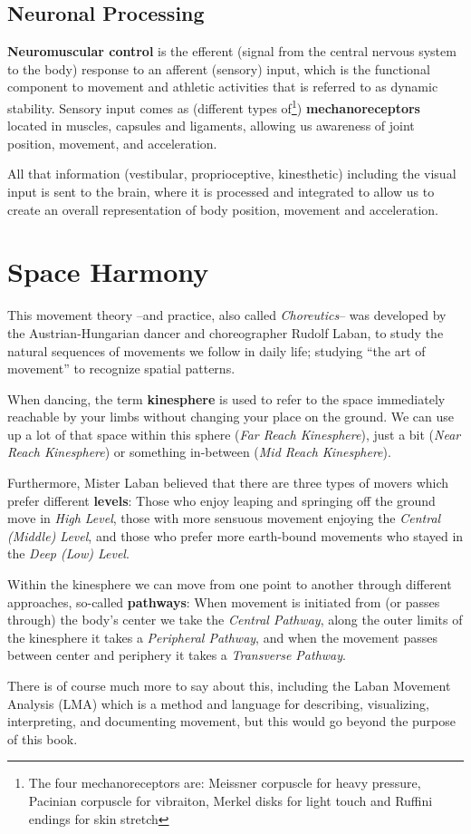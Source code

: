 \subsection{Neuronal Processing}\label{subsec:neuronal-processing}

\textbf{Neuromuscular control} is the efferent (signal from the central nervous system to the body) response to an afferent (sensory) input, which is the functional component to movement and athletic activities that is referred to as dynamic stability.
Sensory input comes as (different types of\footnote{The four mechanoreceptors are: Meissner corpuscle for heavy pressure, Pacinian corpuscle for vibraiton, Merkel disks for light touch and Ruffini endings for skin stretch}) \textbf{mechanoreceptors} located in muscles, capsules and ligaments, allowing us awareness of joint position, movement, and acceleration.

All that information (vestibular, proprioceptive, kinesthetic) including the visual input is sent to the brain, where it is processed and integrated to allow us to create an overall representation of body position, movement and acceleration.

\section{Space Harmony}\label{sec:space-harmony}

This movement theory --and practice, also called \textit{Choreutics}-- was developed by the Austrian-Hungarian dancer and choreographer Rudolf Laban, to study the natural sequences of movements we follow in daily life; studying ``the art of movement'' to recognize spatial patterns.

When dancing, the term \textbf{\gls{kinesphere}} is used to refer to the space immediately reachable by your limbs without changing your place on the ground.
We can use up a lot of that space within this sphere (\textit{Far Reach Kinesphere}), just a bit (\textit{Near Reach Kinesphere}) or something in-between (\textit{Mid Reach Kinesphere}).

Furthermore, Mister Laban believed that there are three types of movers which prefer different \textbf{levels}: Those who enjoy leaping and springing off the ground move in \textit{High Level}, those with more sensuous movement enjoying the \textit{Central (Middle) Level}, and those who prefer more earth-bound movements who stayed in the \textit{Deep (Low) Level}.

Within the kinesphere we can move from one point to another through different approaches, so-called \textbf{pathways}: When movement is initiated from (or passes through) the body's center we take the \textit{Central Pathway}, along the outer limits of the kinesphere it takes a \textit{Peripheral Pathway}, and when the movement passes between center and periphery it takes a \textit{Transverse Pathway}.

There is of course much more to say about this, including the Laban Movement Analysis (LMA) which is a method and language for describing, visualizing, interpreting, and documenting movement, but this would go beyond the purpose of this book.
